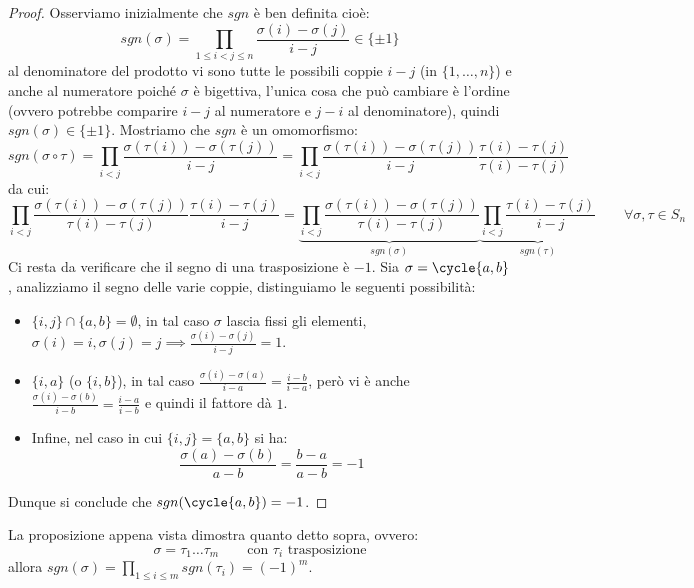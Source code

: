 \documentclass[11pt]{scrartcl}
\begin{document}
\begin{proof}
    Osserviamo inizialmente che $sgn$ è ben definita cioè:
        \[ sgn(\sigma) = \prod_{1 \leq i < j \leq n} \frac{\sigma(i) - \sigma(j)}{i - j} \in \{\pm 1\}
            \]
    al denominatore del prodotto vi sono tutte le possibili coppie $i - j$ (in $\{1,\ldots,n\}$) e anche al numeratore poiché $\sigma$ è bigettiva, l'unica cosa che 
    può cambiare è l'ordine (ovvero potrebbe comparire $i - j$ al numeratore e $j - i$ al denominatore), quindi $sgn(\sigma) \in \{\pm 1\}$. Mostriamo che $sgn$ 
    è un omomorfismo:
        \[ sgn(\sigma \circ \tau) = \prod_{i < j}\frac{\sigma(\tau(i)) - \sigma(\tau(j))}{i - j} =  \prod_{i < j}\frac{\sigma(\tau(i)) - \sigma(\tau(j))}{i - j}\frac{\tau(i) - \tau(j)}{\tau(i) - \tau(j)}
            \]
    da cui:
        \[ \prod_{i < j}\frac{\sigma(\tau(i)) - \sigma(\tau(j))}{\tau(i) - \tau(j)}\frac{\tau(i) - \tau(j)}{ i - j} =
        \underbrace{\prod_{i < j} \frac{\sigma(\tau(i)) - \sigma(\tau(j))}{\tau(i) - \tau(j)}}_{sgn(\sigma)} \underbrace{\prod_{i < j}\frac{\tau(i) - \tau(j)}{ i - j}}_{sgn(\tau)}
        \qquad \forall \sigma,\tau \in S_n
            \]
    Ci resta da verificare che il segno di una trasposizione è $-1$. Sia $\sigma = \cycle{a,b}$, analizziamo il segno delle varie coppie, distinguiamo le seguenti possibilità:
    \begin{itemize}
        \item $\{i,j\} \cap \{a,b\} = \emptyset $, in tal caso $\sigma$ lascia fissi gli elementi, $\sigma(i) = i, \sigma(j) = j \implies \frac{\sigma(i) - \sigma(j)}{i - j} = 1$.
        \item $\{i,a\}$ (o $\{i,b\}$), in tal caso $\frac{\sigma(i) - \sigma(a)}{i - a} = \frac{i - b}{i - a}$, però vi è anche $\frac{\sigma(i) - \sigma(b)}{i - b} = \frac{i - a}{i - b}$ e quindi 
            il fattore dà $1$.
        \item Infine, nel caso in cui $\{i,j\} = \{a,b\}$ si ha:
            \[ \frac{\sigma(a) - \sigma(b)}{a - b} = \frac{b - a}{a - b} = -1
                \]
    \end{itemize}
    Dunque si conclude che $sgn(\cycle{a,b}) = -1$.
\end{proof}

\begin{remark}
    La proposizione appena vista dimostra quanto detto sopra, ovvero:
        \[ \sigma = \tau_1 \ldots \tau_m \qquad \text{con $\tau_i$ trasposizione}
            \]
    allora $sgn(\sigma) = \prod_{1\leq i \leq m}sgn(\tau_i) = (-1)^m$.
\end{remark}
\end{document}
